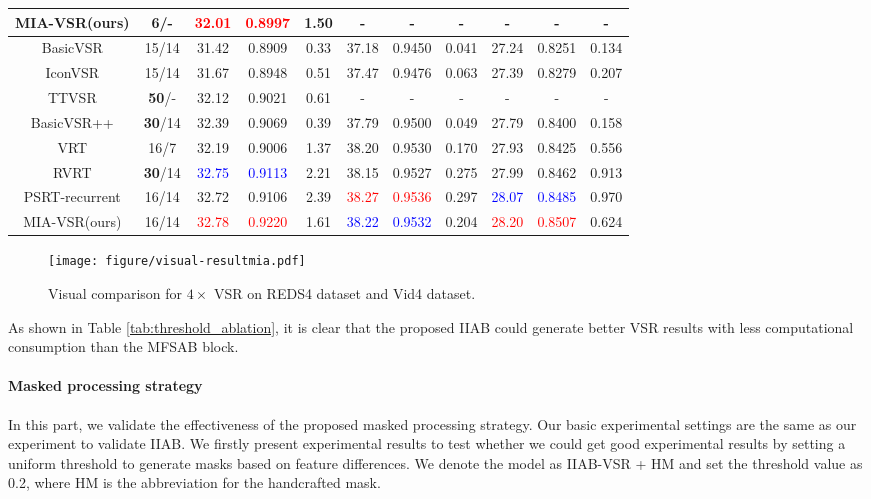 \documentclass[10pt,twocolumn,letterpaper]{article}
\begin{document}
\begin{table*}
\begin{adjustbox}{center}
\begin{tabular}{c|c||ccc|ccc|ccc}
    \rowcolor{gray!20}
    MIA-VSR(ours) & 6/- & \textcolor{red}{32.01} & \textcolor{red}{0.8997} & 1.50 & - & -& -& -& -& -  \\
    \midrule
    BasicVSR\cite{chan2020basicvsr}     & 15/14  & 31.42 & 0.8909& 0.33& 37.18 & 0.9450& 0.041 & 27.24 & 0.8251&0.134\\
    IconVSR\cite{chan2020basicvsr}      & 15/14  & 31.67 & 0.8948& 0.51& 37.47 & 0.9476& 0.063 & 27.39 & 0.8279&0.207\\
    TTVSR\cite{liu2022learning}&\textbf{50}/- &32.12&0.9021&0.61&-&-&-&-&-&-\\
    BasicVSR++\cite{chan2022basicvsr++} & \textbf{30}/14  & 32.39 & 0.9069& 0.39& 37.79 & 0.9500& 0.049 & 27.79 & 0.8400&0.158 \\
    VRT\cite{liang2022vrt}              & 16/7   & 32.19 & 0.9006& 1.37& 38.20 & 0.9530& 0.170 & 27.93 & 0.8425&0.556\\
    RVRT\cite{liang2022recurrent}       & \textbf{30}/14  & \textcolor{blue}{32.75} & \textcolor{blue}{0.9113}& 2.21& 38.15 & 0.9527& 0.275 & 27.99 & 0.8462&0.913 \\
    PSRT-recurrent\cite{shi2022rethinking} & 16/14  & 32.72 & 0.9106&2.39 &\textcolor{red}{38.27} & \textcolor{red}{0.9536}&0.297&\textcolor{blue}{28.07}& \textcolor{blue}{0.8485}&0.970\\
    \rowcolor{gray!20}
    MIA-VSR(ours)& 16/14  & \textcolor{red}{32.78} & \textcolor{red}{0.9220}&1.61 & \textcolor{blue}{38.22}& \textcolor{blue}{0.9532} &0.204& \textcolor{red}{28.20} & \textcolor{red}{0.8507}&0.624\\
    \bottomrule
    \end{tabular}
  \end{adjustbox}
\end{table*}
\begin{figure*}
\centering
\texttt{[image: figure/visual-resultmia.pdf]}
\caption{Visual comparison for $4\times$ VSR on REDS4 dataset and Vid4 dataset.}
\label{fig:sotavisual}
\end{figure*}
As shown in Table \ref{tab:threshold_ablation}, it is clear that the proposed IIAB could generate better VSR results with less computational consumption than the MFSAB block. 
\paragraph{Masked processing strategy}
In this part, we validate the effectiveness of the proposed masked processing strategy.
%
Our basic experimental settings are the same as our experiment to validate IIAB.
%
We firstly present experimental results to test whether we could get good experimental results by setting a uniform threshold to generate masks based on feature differences.
%
We denote the model as IIAB-VSR + HM and set the threshold value as 0.2, where HM is the abbreviation for the handcrafted mask.
%
\end{document}
